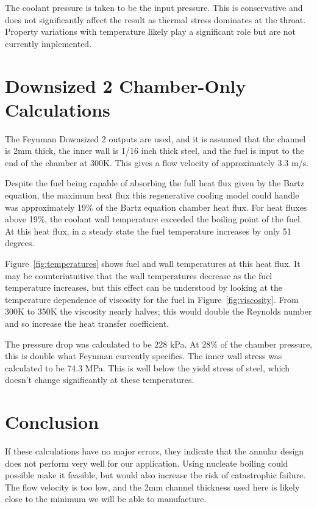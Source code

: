 \documentclass[11pt]{article}
\begin{document}
The coolant pressure is taken to be the input pressure. This is conservative and does not significantly affect the result as thermal stress dominates at the throat. Property variations with temperature likely play a significant role but are not currently implemented.

\section{Downsized 2 Chamber-Only Calculations}

The Feynman Downsized 2 outputs are used, and it is assumed that the channel is 2mm thick, the inner wall is 1/16 inch thick steel, and the fuel is input to the end of the chamber at 300K. This gives a flow velocity of approximately 3.3 m/s.

Despite the fuel being capable of absorbing the full heat flux given by the Bartz equation, the maximum heat flux this regenerative cooling model could handle was approximately 19\% of the Bartz equation chamber heat flux. For heat fluxes above 19\%, the coolant wall temperature exceeded the boiling point of the fuel. At this heat flux, in a steady state the fuel temperature increases by only 51 degrees.

Figure~\ref{fig:temperatures} shows fuel and wall temperatures at this heat flux. It may be counterintuitive that the wall temperatures decrease as the fuel temperature increases, but this effect can be understood by looking at the temperature dependence of viscosity for the fuel in Figure~\ref{fig:viscosity}. From 300K to 350K the viscosity nearly halves; this would double the Reynolds number and so increase the heat transfer coefficient.

The pressure drop was calculated to be 228 kPa. At 28\% of the chamber pressure, this is double what Feynman currently specifies. The inner wall stress was calculated to be 74.3 MPa. This is well below the yield stress of steel, which doesn't change significantly at these temperatures.

\section{Conclusion}

If these calculations have no major errors, they indicate that the annular design does not perform very well for our application. Using nucleate boiling could possible make it feasible, but would also increase the risk of catastrophic failure. The flow velocity is too low, and the 2mm channel thickness used here is likely close to the minimum we will be able to manufacture.
\end{document}
